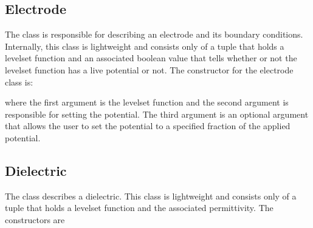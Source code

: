 \documentclass[letterpaper,10pt,english]{sphinxmanual}
\begin{document}
\subsection{Electrode}
\label{\detokenize{Source/ComputationalGeometry:electrode}}\label{\detokenize{Source/ComputationalGeometry:chap-electrode}}
\sphinxAtStartPar
The  class is responsible for describing an electrode and its boundary conditions. Internally, this class is lightweight and consists only of a tuple that holds a level\sphinxhyphen{}set function and an associated boolean value that tells whether or not the level\sphinxhyphen{}set function has a live potential or not. The constructor for the electrode class is:

\begin{sphinxVerbatim}[commandchars=\\\{\},formatcom=\scriptsize]
       
\end{sphinxVerbatim}

\sphinxAtStartPar
where the first argument is the level\sphinxhyphen{}set function and the second argument is responsible for setting the potential. The third argument is an optional argument that allows the user to set the potential to a specified fraction of the applied potential.


\subsection{Dielectric}
\label{\detokenize{Source/ComputationalGeometry:dielectric}}\label{\detokenize{Source/ComputationalGeometry:chap-dielectric}}
\sphinxAtStartPar
The  class describes a dielectric.
This class is lightweight and consists only of a tuple that holds a level\sphinxhyphen{}set function and the associated permittivity.
The constructors are

\begin{sphinxVerbatim}[commandchars=\\\{\},formatcom=\scriptsize]
   
     
\end{sphinxVerbatim}
\end{document}
